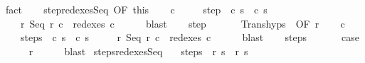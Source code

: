 \begin{isabellebody}
\ fact{\isacharplus}\isanewline
\ \ \isamarkupfalse%
\ step{\isacharunderscore}redexes{\isacharunderscore}Seq\ {\isacharbrackleft}OF\ this{\isacharbrackright}\isanewline
\ \ \isamarkupfalse%
\ c{\isacharprime}\ \isanewline
\ \ \ \ step{\isacharcolon}\ {\isachardoublequoteopen}{\isasymGamma}{\isasymturnstile}\ {\isacharparenleft}c{\isacharcomma}\ s{\isacharparenright}\ {\isasymrightarrow}\ {\isacharparenleft}c{\isacharprime}{\isacharcomma}\ s{\isacharprime}{\isacharprime}{\isacharparenright}{\isachardoublequoteclose}\ \isanewline
\ \ \ \ r{\isacharprime}{\isacharprime}{\isacharcolon}\ {\isachardoublequoteopen}Seq\ r{\isacharprime}{\isacharprime}\ c\ {\isasymin}\ redexes\ c{\isacharprime}{\isachardoublequoteclose}\isanewline
\ \ \ \ \isamarkupfalse%
\ blast\isanewline
\ \ \isamarkupfalse%
\ step\isanewline
\ \ \isamarkupfalse%
\isanewline
\ \ \isamarkupfalse%
\ Trans{\isachardot}hyps\ {\isacharparenleft}{}{\isacharparenright}\ {\isacharbrackleft}OF\ r{\isacharprime}{\isacharprime}{\isacharbrackright}\isanewline
\ \ \isamarkupfalse%
\ c{\isacharprime}{\isacharprime}\ \isanewline
\ \ \ \ steps{\isacharcolon}\ {\isachardoublequoteopen}{\isasymGamma}{\isasymturnstile}\ {\isacharparenleft}c{\isacharprime}{\isacharcomma}\ s{\isacharprime}{\isacharprime}{\isacharparenright}\ {\isasymrightarrow}\isactrlsup {\isacharasterisk}\ {\isacharparenleft}c{\isacharprime}{\isacharprime}{\isacharcomma}\ s{\isacharprime}{\isacharparenright}{\isachardoublequoteclose}\ \isanewline
\ \ \ \ r{\isacharprime}{\isacharcolon}\ {\isachardoublequoteopen}Seq\ r{\isacharprime}\ c\ {\isasymin}\ redexes\ c{\isacharprime}{\isacharprime}{\isachardoublequoteclose}\isanewline
\ \ \ \ \isamarkupfalse%
\ blast\isanewline
\ \ \isamarkupfalse%
\ steps\isanewline
\ \ \isamarkupfalse%
\isanewline
\ \ \isamarkupfalse%
\ {\isacharquery}case\isanewline
\ \ \ \ \isamarkupfalse%
\ r{\isacharprime}\isanewline
\ \ \ \ \isamarkupfalse%
\ blast\isanewline
{}\isamarkupfalse%
%
\endisatagproof
{\isafoldproof}%
%
\isadelimproof
\isanewline
%
\endisadelimproof
\isanewline
{}\isamarkupfalse%
\ steps{\isacharunderscore}redexes{\isacharunderscore}Seq{\isacharprime}{\isacharcolon}\isanewline
\ \ \ steps{\isacharcolon}\ {\isachardoublequoteopen}{\isasymGamma}{\isasymturnstile}\ {\isacharparenleft}r{\isacharcomma}\ s{\isacharparenright}\ {\isasymrightarrow}\isactrlsup {\isacharplus}\ {\isacharparenleft}r{\isacharprime}{\isacharcomma}\ s{\isacharprime}{\isacharparenright}{\isachardoublequoteclose}\isanewline

\end{isabellebody}
